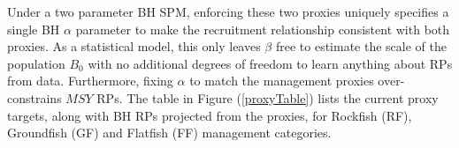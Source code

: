 %
Under a two parameter BH SPM, enforcing these two proxies uniquely 
specifies a single BH $\alpha$ parameter to make the recruitment 
relationship consistent with both proxies.  %
As a statistical model, this only leaves $\beta$ free to estimate the scale of the 
population $B_0$ with no additional degrees of freedom to learn anything about 
RPs from data. Furthermore, fixing $\alpha$ to match the management proxies 
over-constrains $MSY$ RPs. 
The table in Figure (\ref{proxyTable}) lists the current proxy targets, along with BH RPs 
projected from the proxies, for Rockfish (RF), Groundfish (GF) and Flatfish (FF) 
management categories. %


